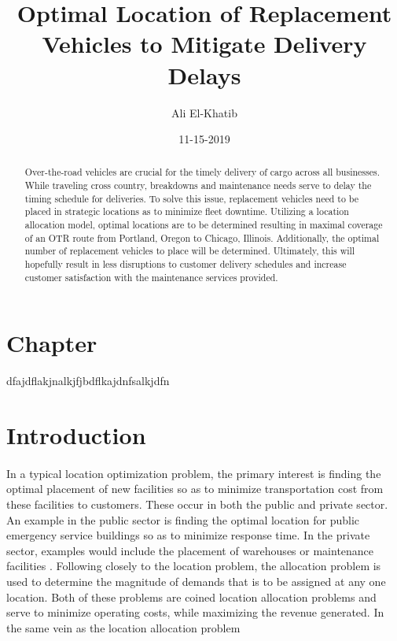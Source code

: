 \documentclass{article}
\title{Optimal Location of Replacement Vehicles to Mitigate Delivery Delays}
\date{11-15-2019}
\author{Ali El-Khatib}
\begin{document}
\maketitle
\begin{abstract}
Over-the-road vehicles are crucial for the timely delivery of cargo across all businesses. While traveling cross country, breakdowns and maintenance needs serve to delay the timing schedule for deliveries. To solve this issue, replacement vehicles need to be placed in strategic locations as to minimize fleet downtime. Utilizing a location allocation model, optimal locations are to be determined resulting in maximal coverage of an OTR route from Portland, Oregon to Chicago, Illinois. Additionally, the optimal number of replacement vehicles to place will be determined. Ultimately, this will hopefully result in less disruptions to customer delivery schedules and increase customer satisfaction with the maintenance services provided. 

\end{abstract}


\newpage

\section{Chapter}
dfajdflakjnalkjfjbdflkajdnfsalkjdfn

\section{Introduction}
\paragraph{}
In a typical location optimization problem, the primary interest is finding the optimal placement of new facilities so as to minimize transportation cost from these facilities to customers\cite{haghani_2010}. These occur in both the public and private sector. An example in the public sector is finding the optimal location for public emergency service buildings so as to minimize response time. In the private sector, examples would include the placement of warehouses or maintenance facilities \cite{akinc1977efficient, akinc_1985}. Following closely to the location problem, the allocation problem is used to determine the magnitude of demands that is to be assigned at any one location. Both of these problems are coined location allocation problems and serve to minimize operating costs, while maximizing the revenue generated. \cite{chung1983capacitated, current1988capacitated, mukundan1991joint}
In the same vein as the location allocation problem
		
\end{document}

